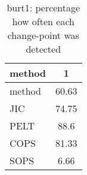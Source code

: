 \begin{table}[ht]
\centering
\begin{tabular}{l|c}
  \hline
method & 1 \\ 
  \hline
method &  60.63 \\ 
  JIC &  74.75 \\ 
  PELT &   88.6 \\ 
  COPS &  81.33 \\ 
  SOPS &   6.66 \\ 
   \hline
\end{tabular}
\caption{burt1: percentage how often each change-point was detected} 
\label{tab:burt1Detections}
\end{table}

